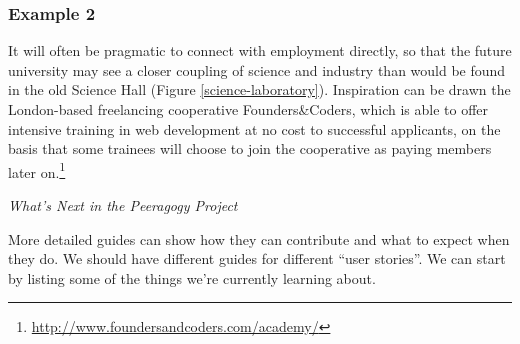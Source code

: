\subsubsection*{Example 2} It will often be pragmatic to connect
 with employment directly, so that the
future university may see a closer coupling of science and industry
than would be found in the old Science Hall (Figure
\ref{science-laboratory}).  Inspiration can be drawn the London-based
freelancing cooperative Founders\&Coders, which is able to offer
intensive training in web development at no cost to successful
applicants, on the basis that some trainees will choose to join the
cooperative as paying members later
on.\footnote{\url{http://www.foundersandcoders.com/academy/}}


\begin{framed}
\noindent 
\emph{What's Next in the Peeragogy Project}
\begin{collectinmacro}{\NewcomerWN}{}{}
More detailed guides can show   how they can contribute and what to expect when they do. We should have different guides for different ``user stories''. We can start by listing some of the things we're currently learning about.
\end{collectinmacro}
\NewcomerWN
\end{framed}

